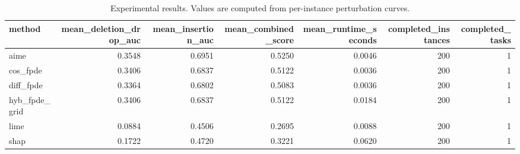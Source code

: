 \begin{table}[t]
\caption{Experimental results. Values are computed from per-instance perturbation curves.}
\label{tab:main_results_computed}
\centering
\begin{tabular}{lrrrrrr}
\toprule
method & mean\_deletion\_drop\_auc & mean\_insertion\_auc & mean\_combined\_score & mean\_runtime\_seconds & completed\_instances & completed\_tasks \\
\midrule
aime & 0.3548 & 0.6951 & 0.5250 & 0.0046 & 200 & 1 \\
cos\_fpde & 0.3406 & 0.6837 & 0.5122 & 0.0036 & 200 & 1 \\
diff\_fpde & 0.3364 & 0.6802 & 0.5083 & 0.0036 & 200 & 1 \\
hyb\_fpde\_grid & 0.3406 & 0.6837 & 0.5122 & 0.0184 & 200 & 1 \\
lime & 0.0884 & 0.4506 & 0.2695 & 0.0088 & 200 & 1 \\
shap & 0.1722 & 0.4720 & 0.3221 & 0.0620 & 200 & 1 \\
\bottomrule
\end{tabular}

\end{table}
